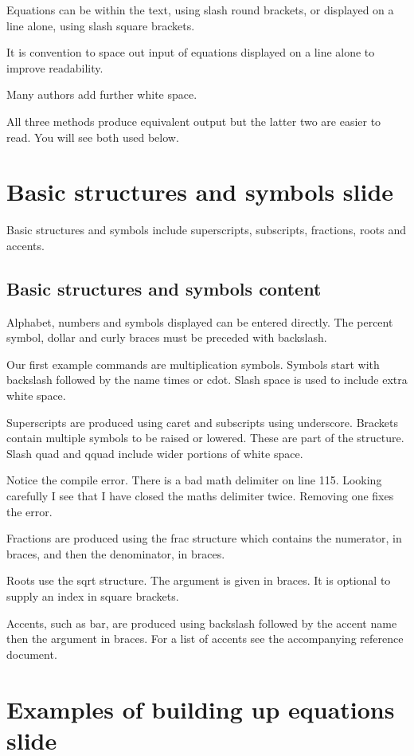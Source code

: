 \documentclass[a4paper,14pt]{extarticle}
\begin{document}
Equations can be within the text, using slash round brackets, or displayed on a line alone, using slash square brackets. 

It is convention to space out input of equations displayed on a line alone to improve readability. 

Many authors add further white space. 

All three methods produce equivalent output but the latter two are easier to read. You will see both used below.  

\section{Basic structures and symbols slide}

Basic structures and symbols include superscripts, subscripts, fractions, roots and accents.

\subsection{Basic structures and symbols content}

Alphabet, numbers and symbols displayed can be entered directly. The percent symbol, dollar and curly braces must be preceded with backslash. 

Our first example commands are multiplication symbols. Symbols start with backslash followed by the name times or cdot. Slash space is used to include extra white space.  

Superscripts are produced using caret and subscripts using underscore. Brackets contain multiple symbols to be raised or lowered. These are part of the structure. Slash quad and qquad include wider portions of white space. 

Notice the compile error. There is a bad math delimiter on line 115. Looking carefully I see that I have closed the maths delimiter twice. Removing one fixes the error.  

Fractions are produced using the frac structure which contains the numerator, in braces, and then the denominator, in braces. 

Roots use the sqrt structure. The argument is given in braces. It is optional to supply an index in square brackets. 

Accents, such as bar, are produced using backslash followed by the accent name then the argument in braces. For a list of accents see the accompanying reference document. 

\section{Examples of building up equations slide}
\end{document}
